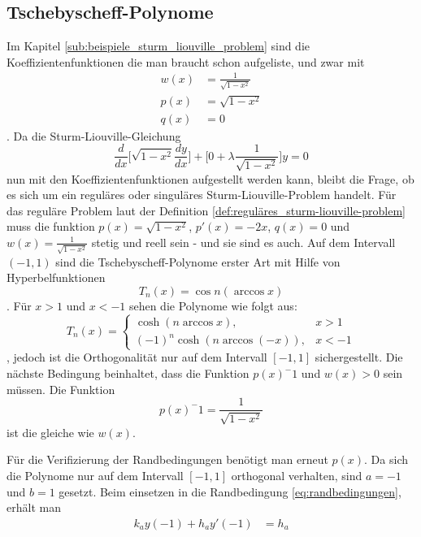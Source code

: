 %
%
%

\subsection{Tschebyscheff-Polynome\label{sub:tschebyscheff-polynome}}
Im Kapitel \ref{sub:beispiele_sturm_liouville_problem} sind die Koeffizientenfunktionen die man braucht schon aufgeliste, und zwar mit
\begin{align*}
	w(x) &= \frac{1}{\sqrt{1-x^2}} \\
	p(x) &= \sqrt{1-x^2} \\
	q(x) &= 0
\end{align*}.
Da die Sturm-Liouville-Gleichung
\begin{equation}
	\label{eq:sturm-liouville-equation-tscheby}
	\frac{d}{dx}\lbrack \sqrt{1-x^2} \frac{dy}{dx} \rbrack + \lbrack 0 + \lambda \frac{1}{\sqrt{1-x^2}} \rbrack y = 0 
\end{equation}
nun mit den Koeffizientenfunktionen aufgestellt werden kann, bleibt die Frage, ob es sich um ein reguläres oder singuläres Sturm-Liouville-Problem handelt.
Für das reguläre Problem laut der Definition \ref{def:reguläres_sturm-liouville-problem} muss die funktion $p(x) = \sqrt{1-x^2}$, $p'(x) = -2x$, $q(x) = 0$ und $w(x) = \frac{1}{\sqrt{1-x^2}}$ stetig und reell sein - und sie sind es auch.
Auf dem Intervall $(-1,1)$ sind die Tschebyscheff-Polynome erster Art mit Hilfe von Hyperbelfunktionen
\begin{equation}
	T_n(x) = \cos n (\arccos x)
\end{equation}.
Für $x>1$ und $x<-1$ sehen die Polynome wie folgt aus:
\begin{equation}
	T_n(x) = \left\{\begin{array}{ll} \cosh (n \arccos x), & x > 1\\
		(-1)^n \cosh (n \arccos (-x)), & x<-1 \end{array}\right.
\end{equation},
jedoch ist die Orthogonalität nur auf dem Intervall $[ -1, 1]$ sichergestellt.
Die nächste Bedingung beinhaltet, dass die Funktion $p(x)^-1$ und $w(x)>0$ sein müssen.
Die Funktion
\begin{equation*}
	p(x)^-1 = \frac{1}{\sqrt{1-x^2}}
\end{equation*}
ist die gleiche wie $w(x)$.

Für die Verifizierung der Randbedingungen benötigt man erneut $p(x)$.
Da sich die Polynome nur auf dem Intervall $[ -1,1 ]$ orthogonal verhalten, sind $a = -1$ und $b = 1$ gesetzt.
Beim einsetzen in die Randbedingung \ref{eq:randbedingungen}, erhält man
\begin{equation}
\begin{aligned}
	k_a y(-1) + h_a y'(-1) &= h_a 
\end{aligned} 
\end{equation}












